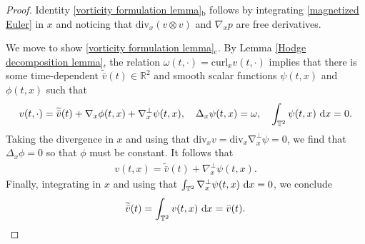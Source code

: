 \documentclass[11pt,reqno]{amsart}
\numberwithin{equation}{section}
\def\dd{{\rm d}}
\begin{document}
\begin{proof}
Identity \eqref{vorticity formulation lemma}$_{\mathrm{b}}$ follows 
by integrating \eqref{magnetized Euler} in $x$ and noticing that $\mathrm{div}_{x}(v\otimes v)$ and $\nabla_{x}p$ are free derivatives. 

We move to show \eqref{vorticity formulation lemma}$_{\mathrm{c}}$. 
By Lemma \ref{Hodge decomposition lemma},  
the relation $\omega(t,\cdot)=\mathrm{curl}_{x}v(t,\cdot)$ implies that there is 
some time-dependent $\widetilde{\bar{v}}(t)\in \mathbb{R}^{2}$ 
and smooth scalar functions $\psi(t,x)$ and $\phi(t,x)$ such that
\begin{align*}
v(t,\cdot)=\widetilde{\bar{v}}(t)+\nabla_{x}\phi(t,x)+\nabla_{x}^{\perp}\psi(t,x), 
\quad \Delta_{x} \psi(t,x)=\omega, \quad \int_{\mathbb{T}^{2}}\psi(t,x)\ \dd x=0. 
\end{align*}
Taking the divergence in $x$ and using that  $\mathrm{div}_{x}v=\mathrm{div}_{x}\mathrm{\nabla}_{x}^{\perp}\psi=0$, 
we find that $\Delta_{x}\phi=0$ so that $\phi$ must be constant. It follows that 
\begin{align*}
v(t,x)=\widetilde{\bar{v}}(t)+\nabla_{x}^{\perp}\psi(t,x).    
\end{align*}
Finally, integrating in $x$ and using that $\int_{\mathbb{T}^{2}}\nabla_{x}^{\perp}\psi(t,x)\ \dd x=0$,
we conclude
\begin{align*}
\widetilde{\bar{v}}(t)=\int_{\mathbb{T}^{2}}v(t,x)\ \dd x=\bar{v}(t).     
\end{align*}


\end{proof}
\end{document}

